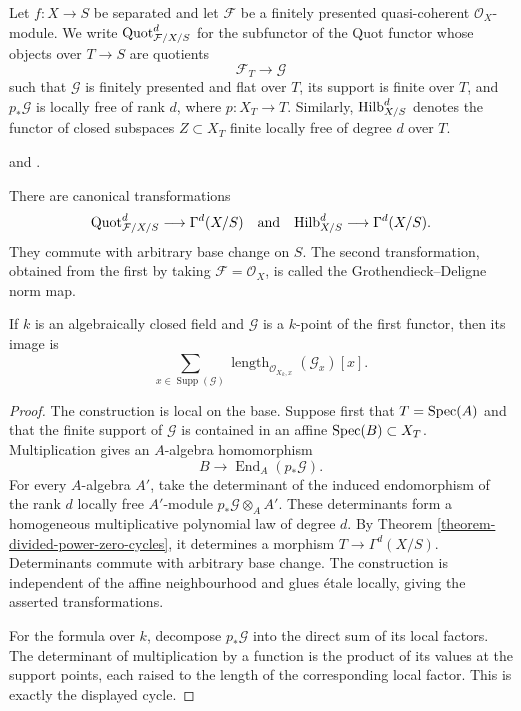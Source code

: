 \noindent
Let $f : X \to S$ be separated and let $\mathcal{F}$ be a finitely presented
quasi-coherent $\mathcal{O}_X$-module. We write
$\mathrm{Quot}^d_{\mathcal{F}/X/S}$ for the subfunctor of the Quot functor
whose objects over $T \to S$ are quotients
$$
\mathcal{F}_T \longrightarrow \mathcal{G}
$$
such that $\mathcal{G}$ is finitely presented and flat over $T$, its support
is finite over $T$, and $p_*\mathcal{G}$ is locally free of rank $d$, where
$p : X_T \to T$. Similarly, $\mathrm{Hilb}^d_{X/S}$ denotes the functor of
closed subspaces $Z \subset X_T$ finite locally free of degree $d$ over $T$.

\begin{proposition}
\label{proposition-grothendieck-deligne-norm}
\begin{reference}
\cite[Expos\'e 221, Section 6]{FGA} and
\cite[Sections 3 and 6]{Rydh-zero-cycles-II}.
\end{reference}
There are canonical transformations
$$
\mathrm{Quot}^d_{\mathcal{F}/X/S} \longrightarrow \Gamma^d(X/S)
\quad\text{and}\quad
\mathrm{Hilb}^d_{X/S} \longrightarrow \Gamma^d(X/S).
$$
They commute with arbitrary base change on $S$. The second transformation,
obtained from the first by taking $\mathcal{F} = \mathcal{O}_X$, is called
the Grothendieck--Deligne norm map.

If $k$ is an algebraically closed field and $\mathcal{G}$ is a $k$-point of
the first functor, then its image is
$$
\sum_{x \in \operatorname{Supp}(\mathcal{G})}
\operatorname{length}_{\mathcal{O}_{X_k,x}}(\mathcal{G}_x)[x].
$$
\end{proposition}

\begin{proof}
The construction is local on the base. Suppose first that $T = \mathop{\mathrm{Spec}}(A)$
and that the finite support of $\mathcal{G}$ is contained in an affine
$\mathop{\mathrm{Spec}}(B) \subset X_T$. Multiplication gives an $A$-algebra homomorphism
$$
B \longrightarrow \operatorname{End}_A(p_*\mathcal{G}).
$$
For every $A$-algebra $A'$, take the determinant of the induced endomorphism
of the rank $d$ locally free $A'$-module
$p_*\mathcal{G} \otimes_A A'$. These determinants form a homogeneous
multiplicative polynomial law of degree $d$. By Theorem
\ref{theorem-divided-power-zero-cycles}, it determines a morphism
$T \to \Gamma^d(X/S)$. Determinants commute with arbitrary base change.
The construction is independent of the affine neighbourhood and glues
\'etale locally, giving the asserted transformations.

For the formula over $k$, decompose $p_*\mathcal{G}$ into the direct sum of
its local factors. The determinant of multiplication by a function is the
product of its values at the support points, each raised to the length of
the corresponding local factor. This is exactly the displayed cycle.
\end{proof}

